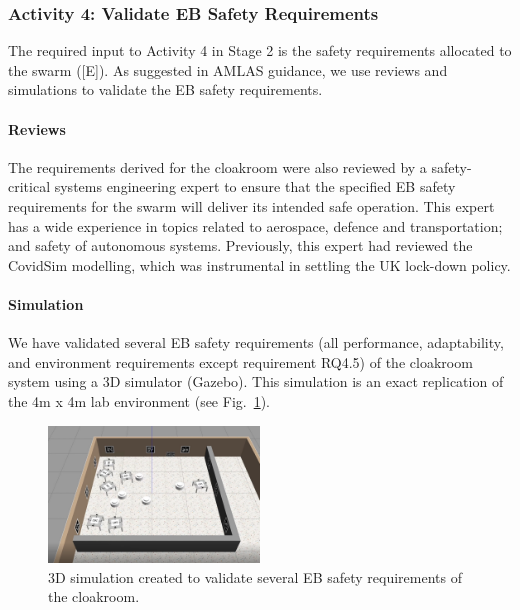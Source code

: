 \documentclass[lettersize,journal]{IEEEtran}
\begin{document}
\subsubsection*{Activity 4: Validate EB Safety Requirements}

The required input to Activity 4 in Stage 2 is the safety requirements allocated to the swarm ([E]). 
As suggested in AMLAS guidance, we use reviews and simulations to validate the EB safety requirements.

\paragraph*{Reviews} The requirements derived for the cloakroom were also reviewed by a safety-critical systems engineering expert to ensure that the specified EB safety requirements for the swarm will deliver its intended safe operation. This expert has a wide experience in topics related to aerospace, defence and transportation; and safety of autonomous systems. Previously, this expert had reviewed the CovidSim modelling, which was instrumental in settling the UK lock-down policy. 

\paragraph*{Simulation}We have validated several EB safety requirements (all performance, adaptability, and environment requirements except requirement RQ4.5) of the cloakroom system using a 3D simulator (Gazebo). This simulation is an exact replication of the 4m x 4m lab environment (see Fig.~\ref{3Dsim}). 

\begin{figure}[!t]
	\centering
	\includegraphics[width=0.5\textwidth]{figures/3Dsim.png}
	\caption{3D simulation created to validate several EB safety requirements of the cloakroom.}
	\label{3Dsim}
\end{figure}
\end{document}
